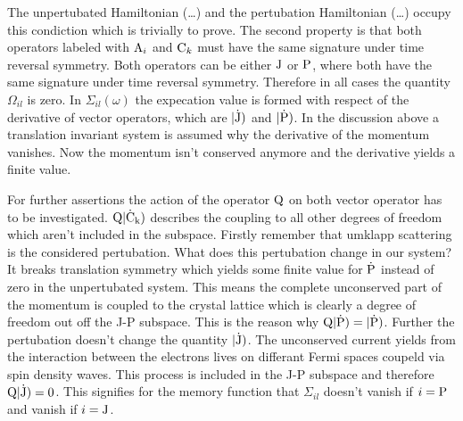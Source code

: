 The unpertubated Hamiltonian (\dots{}) and the pertubation Hamiltonian (\dots{}) occupy this condiction which is trivially to prove.
The second property is that both operators labeled with $\mathrm{A}_{i}$ and $\mathrm{C}_{k}$ must have the same signature under time reversal symmetry.
Both operators can be either $\mathrm{J}$ or $\mathrm{P}$, where both have the same signature under time reversal symmetry.
Therefore in all cases the quantity $\Omega_{il}$ is zero.
In $\Sigma_{il}(\omega)$ the expecation value is formed with respect of the derivative of vector operators, which are $|\mathrm{\dot{\mathrm{J}}})$ and $|\mathrm{\dot{\mathrm{P}}})$.
In the discussion above a translation invariant system is assumed why the derivative of the momentum vanishes.
Now the momentum isn't conserved anymore and the derivative yields a finite value.

For further assertions the action of the operator $\mathrm{Q}$ on both vector operator has to be investigated.
$\mathrm{Q} |\mathrm{\dot{\mathrm{C}}_{k}})$ describes the coupling to all other degrees of freedom which aren't included in the subspace.
Firstly remember that umklapp scattering is the considered pertubation.
What does this pertubation change in our system?
It breaks translation symmetry which yields some finite value for $\dot{\mathrm{P}}$ instead of zero in the unpertubated system.
This means the complete unconserved part of the momentum is coupled to the crystal lattice which is clearly a degree of freedom out off the J-P subspace.
This is the reason why $\mathrm{Q} |\mathrm{\dot{\mathrm{P}}}) = |\mathrm{\dot{\mathrm{P}}})$.
Further the pertubation doesn't change the quantity $|\mathrm{\dot{\mathrm{J}}})$.
The unconserved current yields from the interaction between the electrons lives on differant Fermi spaces coupeld via spin density waves.
This process is included in the J-P subspace and therefore $\mathrm{Q} |\mathrm{\dot{\mathrm{J}}}) = 0$.
This signifies for the memory function that $\Sigma_{il}$ doesn't vanish if $i=\mathrm{P}$ and vanish if $i=\mathrm{J}$.

